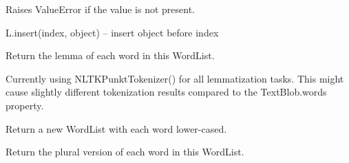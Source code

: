 \documentclass[letterpaper,10pt,english]{sphinxmanual}
\begin{document}
\begin{fulllineitems}
\begin{fulllineitems}
\end{fulllineitems}


\begin{fulllineitems}
\label{api_reference:textblob_de.blob.WordList.index}
Raises ValueError if the value is not present.

\end{fulllineitems}


\begin{fulllineitems}
\label{api_reference:textblob_de.blob.WordList.insert}
L.insert(index, object) -- insert object before index

\end{fulllineitems}


\begin{fulllineitems}
\label{api_reference:textblob_de.blob.WordList.lemmatize}
Return the lemma of each word in this WordList.

Currently using NLTKPunktTokenizer() for all lemmatization
tasks. This might cause slightly different tokenization results
compared to the TextBlob.words property.

\end{fulllineitems}


\begin{fulllineitems}
\label{api_reference:textblob_de.blob.WordList.lower}
Return a new WordList with each word lower-cased.

\end{fulllineitems}


\begin{fulllineitems}
\label{api_reference:textblob_de.blob.WordList.pluralize}
Return the plural version of each word in this WordList.


\end{fulllineitems}
\end{fulllineitems}
\end{document}
